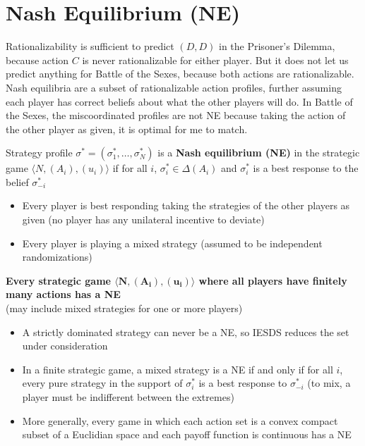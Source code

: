 \documentclass{report}
\begin{document}
\section*{Nash Equilibrium (NE)}\medskip

Rationalizability is sufficient to predict $(D,D)$ in the Prisoner's Dilemma, because action $C$ is never rationalizable for either player. But it does not let us predict anything for Battle of the Sexes, because both actions are rationalizable. Nash equilibria are a subset of rationalizable action profiles, further assuming each player has correct beliefs about what the other players will do. In Battle of the Sexes, the miscoordinated profiles are not NE because taking the action of the other player as given, it is optimal for me to match. \bigskip 

Strategy profile $\sigma^* = (\sigma_1^*,\dots,\sigma_N^*)$ is a \textbf{Nash equilibrium (NE)} in the strategic game $\langle N,(A_i),(u_i) \rangle$ if for all $i$, $\sigma_i^* \in \Delta(A_i)$ and $\sigma_i^*$ is a best response to the belief $\sigma_{-i}^*$ 
\begin{itemize}
	\item{Every player is best responding taking the strategies of the other players as given (no player has any unilateral incentive to deviate)}
	\item{Every player is playing a mixed strategy (assumed to be independent randomizations)}
\end{itemize} \bigskip

\textbf{Every strategic game $\boldsymbol{\langle N,(A_i),(u_i) \rangle}$ where all players have finitely many actions has a NE}\\ (may include mixed strategies for one or more players)
\begin{itemize}
	\item{A strictly dominated strategy can never be a NE, so IESDS reduces the set under consideration}
	\item In a finite strategic game, a mixed strategy is a NE if and only if for all $i$, every pure strategy in the support of $\sigma_i^*$ is a best response to $\sigma_{-i}^*$ (to mix, a player must be indifferent between the extremes)
	\item More generally, every game in which each action set is a convex compact subset of a Euclidian space and each payoff function is continuous has a NE
\end{itemize}
\end{document}
